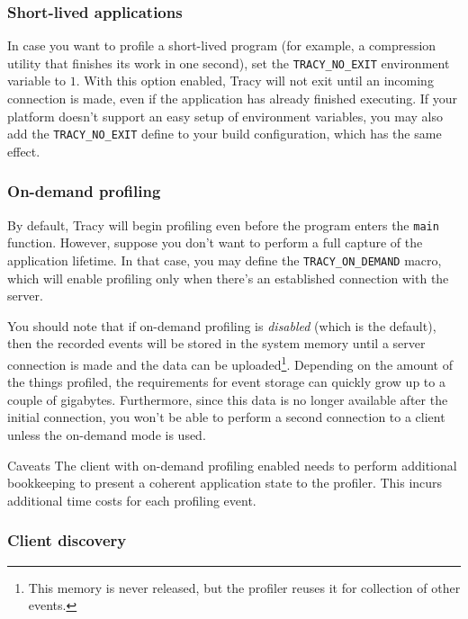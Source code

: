 \documentclass[hidelinks,titlepage,a4paper]{article}
\begin{document}
\subsubsection{Short-lived applications}

In case you want to profile a short-lived program (for example, a compression utility that finishes its work in one second), set the \texttt{TRACY\_NO\_EXIT} environment variable to $1$. With this option enabled, Tracy will not exit until an incoming connection is made, even if the application has already finished executing. If your platform doesn't support an easy setup of environment variables, you may also add the \texttt{TRACY\_NO\_EXIT} define to your build configuration, which has the same effect.

\subsubsection{On-demand profiling}
\label{ondemand}

By default, Tracy will begin profiling even before the program enters the \texttt{main} function. However, suppose you don't want to perform a full capture of the application lifetime. In that case, you may define the \texttt{TRACY\_ON\_DEMAND} macro, which will enable profiling only when there's an established connection with the server.

You should note that if on-demand profiling is \emph{disabled} (which is the default), then the recorded events will be stored in the system memory until a server connection is made and the data can be uploaded\footnote{This memory is never released, but the profiler reuses it for collection of other events.}. Depending on the amount of the things profiled, the requirements for event storage can quickly grow up to a couple of gigabytes. Furthermore, since this data is no longer available after the initial connection, you won't be able to perform a second connection to a client unless the on-demand mode is used.

\begin{bclogo}[
noborder=true,
couleur=black!5,
logo=\bcattention
]{Caveats}
The client with on-demand profiling enabled needs to perform additional bookkeeping to present a coherent application state to the profiler. This incurs additional time costs for each profiling event.
\end{bclogo}

\subsubsection{Client discovery}
\end{document}
